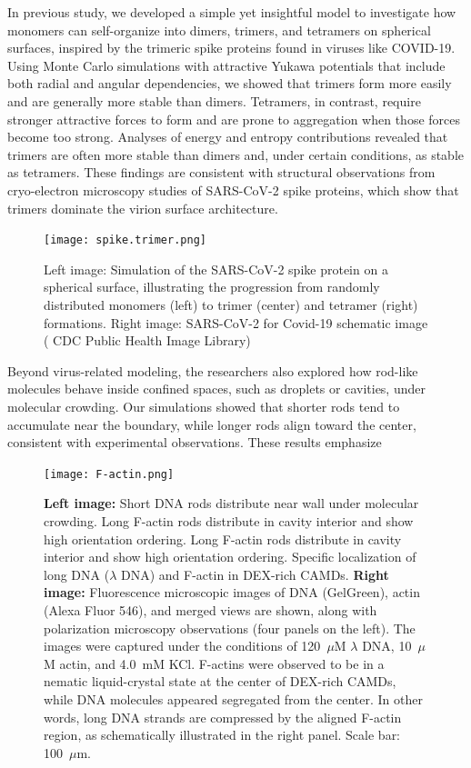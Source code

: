 \documentclass[12pt]{article}
\begin{document}
\begin{flushleft}
In previous study, we developed a simple yet insightful model to investigate how monomers can self-organize into dimers, trimers, and tetramers on spherical surfaces, inspired by the trimeric spike proteins found in viruses like COVID-19. Using Monte Carlo simulations with attractive Yukawa potentials that include both radial and angular dependencies, we showed that trimers form more easily and are generally more stable than dimers. Tetramers, in contrast, require stronger attractive forces to form and are prone to aggregation when those forces become too strong. Analyses of energy and entropy contributions revealed that trimers are often more stable than dimers and, under certain conditions, as stable as tetramers. These findings are consistent with structural observations from cryo-electron microscopy studies of SARS-CoV-2 spike proteins, which show that trimers dominate the virion surface architecture\cite{Ke2020}.

\begin{figure}[!ht]
  \centering
  \texttt{[image: spike.trimer.png]}
  \caption{Left image: Simulation of the SARS-CoV-2 spike protein on a spherical surface, illustrating the progression from randomly distributed monomers (left) to trimer (center) and tetramer (right) formations. Right image: SARS-CoV-2 for Covid-19 schematic image ( CDC Public
Health Image Library) \cite{cdc-covid}}
\end{figure}

Beyond virus-related modeling, the researchers also explored how rod-like molecules
behave inside confined spaces, such as droplets or cavities, under molecular crowding. Our simulations showed that shorter rods tend to accumulate near the boundary, while longer rods align toward the center, consistent with experimental observations. These results emphasize

\begin{figure}[!ht]
  \centering
   \texttt{[image: F-actin.png]}
 
  \caption{\textbf{Left image:} Short DNA rods distribute near wall under molecular crowding. Long F-actin rods distribute in cavity interior and show high orientation ordering. Long F-actin rods distribute in cavity interior and show high orientation ordering.  Specific localization of 
  long DNA ($\lambda$ DNA) and F-actin in DEX-rich CAMDs.    
       \textbf{Right image:} Fluorescence microscopic images of DNA (GelGreen), actin (Alexa Fluor 546), and merged views are shown, along with polarization microscopy observations (four panels on the left). 
        The images were captured under the conditions of 120~$\mu$M $\lambda$ DNA, 10~$\mu$M actin, and 4.0~mM KCl. 
        F-actins were observed to be in a nematic liquid-crystal state at the center of DEX-rich CAMDs, while DNA molecules appeared segregated from the center. 
        In other words, long DNA strands are compressed by the aligned F-actin region, as schematically illustrated in the right panel. 
        Scale bar: 100~$\mu$m.\cite {nakatani2018}}
\end{figure}




\end{flushleft}
\end{document}
